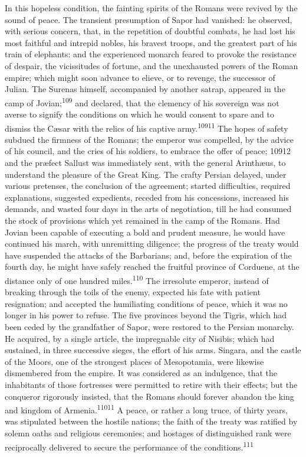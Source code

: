 In this hopeless condition, the fainting spirits of the Romans
were revived by the sound of peace. The transient presumption of
Sapor had vanished: he observed, with serious concern, that, in
the repetition of doubtful combats, he had lost his most faithful
and intrepid nobles, his bravest troops, and the greatest part of
his train of elephants: and the experienced monarch feared to
provoke the resistance of despair, the vicissitudes of fortune,
and the unexhausted powers of the Roman empire; which might soon
advance to elieve, or to revenge, the successor of Julian. The
Surenas himself, accompanied by another satrap, appeared in the
camp of Jovian;\textsuperscript{109} and declared, that the clemency of his
sovereign was not averse to signify the conditions on which he
would consent to spare and to dismiss the Cæsar with the relics
of his captive army.\textsuperscript{10911} The hopes of safety subdued the
firmness of the Romans; the emperor was compelled, by the advice
of his council, and the cries of his soldiers, to embrace the
offer of peace; 10912 and the præfect Sallust was immediately
sent, with the general Arinthæus, to understand the pleasure of
the Great King. The crafty Persian delayed, under various
pretenses, the conclusion of the agreement; started difficulties,
required explanations, suggested expedients, receded from his
concessions, increased his demands, and wasted four days in the
arts of negotiation, till he had consumed the stock of provisions
which yet remained in the camp of the Romans. Had Jovian been
capable of executing a bold and prudent measure, he would have
continued his march, with unremitting diligence; the progress of
the treaty would have suspended the attacks of the Barbarians;
and, before the expiration of the fourth day, he might have
safely reached the fruitful province of Corduene, at the distance
only of one hundred miles.\textsuperscript{110} The irresolute emperor, instead of
breaking through the toils of the enemy, expected his fate with
patient resignation; and accepted the humiliating conditions of
peace, which it was no longer in his power to refuse. The five
provinces beyond the Tigris, which had been ceded by the
grandfather of Sapor, were restored to the Persian monarchy. He
acquired, by a single article, the impregnable city of Nisibis;
which had sustained, in three successive sieges, the effort of
his arms. Singara, and the castle of the Moors, one of the
strongest places of Mesopotamia, were likewise dismembered from
the empire. It was considered as an indulgence, that the
inhabitants of those fortresses were permitted to retire with
their effects; but the conqueror rigorously insisted, that the
Romans should forever abandon the king and kingdom of Armenia.\textsuperscript{11011}
A peace, or rather a long truce, of thirty years, was
stipulated between the hostile nations; the faith of the treaty
was ratified by solemn oaths and religious ceremonies; and
hostages of distinguished rank were reciprocally delivered to
secure the performance of the conditions.\textsuperscript{111}

